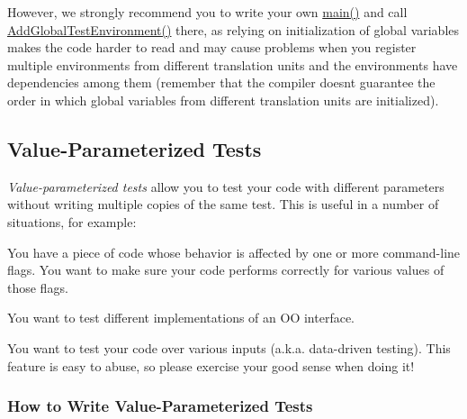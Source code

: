 \begin{DoxyCode}{0}
\end{DoxyCode}


However, we strongly recommend you to write your own {\ttfamily \mbox{\hyperlink{3_814_83_2CompilerIdC_2CMakeCCompilerId_8c_a0ddf1224851353fc92bfbff6f499fa97}{main()}}} and call {\ttfamily \mbox{\hyperlink{namespacetesting_a460d7b998622e332392c1e00be3a60d5}{Add\+Global\+Test\+Environment()}}} there, as relying on initialization of global variables makes the code harder to read and may cause problems when you register multiple environments from different translation units and the environments have dependencies among them (remember that the compiler doesn\textquotesingle{}t guarantee the order in which global variables from different translation units are initialized).

\subsection*{Value-\/\+Parameterized Tests}

{\itshape Value-\/parameterized tests} allow you to test your code with different parameters without writing multiple copies of the same test. This is useful in a number of situations, for example\+:


\begin{DoxyItemize}
\item You have a piece of code whose behavior is affected by one or more command-\/line flags. You want to make sure your code performs correctly for various values of those flags.
\item You want to test different implementations of an OO interface.
\item You want to test your code over various inputs (a.\+k.\+a. data-\/driven testing). This feature is easy to abuse, so please exercise your good sense when doing it!
\end{DoxyItemize}

\subsubsection*{How to Write Value-\/\+Parameterized Tests}

